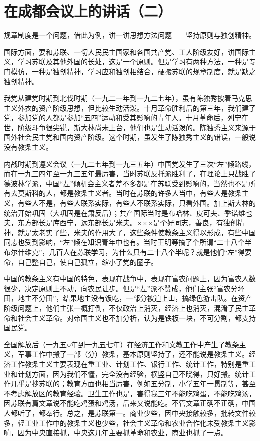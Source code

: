 \section[在成都会议上的讲话（二）（一九五八年三月十日）]{在成都会议上的讲话（二）}


规章制度是一个问题，借此为例，讲一讲思想方法问题——坚持原则与独创精神。

国际方面，要和苏联、一切人民民主国家和各国共产党、工人阶级友好，讲国际主义，学习苏联及其他外国的长处，这是一个原则。但是学习有两种方法，一种是专门模仿，一种是独创精神，学习应和独创相结合，硬搬苏联的规章制度，就是缺之独创精神。

我党从建党时期到北伐时期（一九二一年到一九二七年），虽有陈独秀披着马克思主义外衣的资产阶级思想，但比较生动活泼。十月革命胜利后的第三年，我们建了党，参加党的人都是参加“五四”运动和受其影响的青年人。十月革命后，列宁在世，阶级斗争很尖锐，斯大林尚未上台，他们也是生动活泼的。陈独秀主义来源于国外社会民主党和国内资产阶级。这个时期，虽发生了陈独秀主义的错误，一般说没有教条主义。

内战时期到遵义会议（一九二七年到一九三五年）中国党发生了三次“左”倾路线，而在一九三四年至一九三五年最厉害，当时苏联反托派胜利了，在理论上只战胜了德波林学派，中国“左”倾机会主义者差不多都是在苏联受到影响的，当然也不是所有去莫斯科的人，都是教条主义者。当时在苏联的许多人当中，有些人是教条主义，有些人不是，有些人联系实际，有些人不联系实际，只看外国。加上斯大林的统治开始巩固（大巩固是在肃反后）；共产国际当时是布哈林、皮可夫、季诺维也夫，东方部长是库西宁，远东部长是米夫。×××是个好同志，善良，有独创精神，就是太老实了些，米夫的作用大了，这些条件使教条主义得以形成，有些中国同志也受到影响，“左”倾在知识青年中也有。当时王明等搞了个所谓“二十八个半布尔什维克”，几百人在苏联学习，为什么只有二十八个半呢？就是他们“左”得要命，自己整自己，使自己孤立，缩小了党的圈子。

中国的教条主义有中国的特色，表现在战争中，表现在富农问题上，因为富农人数很少，决定原则上不动，向农民让步。但是“左”派不赞成，他们主张“富农分坏田，地主不分田”，结果地主没有饭吃，一部分被迫上山，搞绿色游击队。在资产阶级问题上，他们主张一概打倒，不仅政治上消灭，经济上也消灭，混淆了民主革命和社会主义革命。对帝国主义也不加分析，认为是铁板一块，不可分割，都支持国民党。

全国解放后（一九五○年到一九五七年）在经济工作和文教工作中产生了教条主义，军事工作中搬了一部（分）教条，基本原则坚持了，还不能说是教条主义。经济工作教条主义主要表现在重工业、计划工作、银行工作、统计工作，特别是重工业和计划方面，因为我们不懂，完全没有经验，横竖自己不晓得，只好搬。统计工作几乎是抄苏联的；教育方面也相当厉害，例如五分制，小学五年一贯制等，甚至不考虑解放区的教育经验。卫生工作也是，害得我三年不能吃鸡蛋，不能吃鸡汤，因苏联有篇文章说不能吃鸡蛋和鸡汤，后来又说能吃。不管文章正确不正确，中国人都听了，都奉行。总之，是苏联第一。商业少些，因中央接触较多，批转文件较多，轻工业工作中的教条主义也少些，社会主义革命和农业合作化未受教条主义影响，因为中央直接抓，中央这几年主要抓革命和农业，商业也抓了一点。

